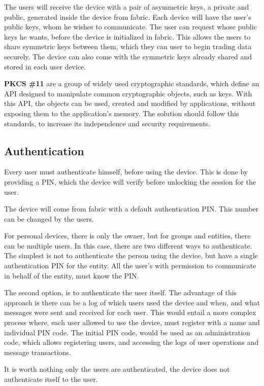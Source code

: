 The users will receive the device with a pair of asymmetric keys, a private and public, generated inside the device from fabric. Each device will have the user's public keys, whom he wishes to communicate. The user can request whose public keys he wants, before the device is initialized in fabric. This allows the users to share symmetric keys between them, which they can user to begin trading data securely. The device can also come with the symmetric keys already shared and stored in each user device.

\textbf{\ac{PKCS} \#11} are a group of widely used cryptographic standards, which define an \ac{API} designed to manipulate common cryptographic objects, such as keys.
With this \ac{API}, the objects can be used, created and modified by applications, without exposing them to the application's memory.
The solution should follow this standards, to increase its independence and security requirements.

\subsection{Authentication} \label{chap:problem:services:auth}
Every user must authenticate himself, before using the device. This is done by providing a \ac{PIN}, which the device will verify before unlocking the session for the user.

The device will come from fabric with a default authentication \ac{PIN}. This number can be changed by the users.

For personal devices, there is only the owner, but for groups and entities, there can be multiple users. In this case, there are two different ways to authenticate. The simplest is not to authenticate the person using the device, but have a single authentication \ac{PIN} for the entity. All the user's with permission to communicate in behalf of the entity, must know the \ac{PIN}.

The second option, is to authenticate the user itself. The advantage of this approach is there can be a log of which users used the device and when, and what messages were sent and received for each user.
This would entail a more complex process where, each user allowed to use the device, must register with a name and individual \ac{PIN} code. The initial \ac{PIN} code, would be used as an administration code, which allows registering users, and accessing the logs of user operations and message transactions.

It is worth nothing only the users are authenticated, the device does not authenticate itself to the user.

